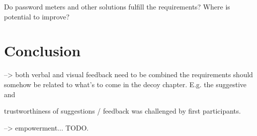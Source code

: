 Do password meters and other solutions fulfill the requirements?
Where is potential to improve?



\section{Conclusion}



--> both verbal and visual feedback need to be combined
the requirements should somehow be related to what's to come in the decoy chapter. E.g. the suggestive and 

trustworthiness of suggestions / feedback was challenged by first participants.




--> empowerment... TODO.


\vspace*{1cm}\noindent
{}


